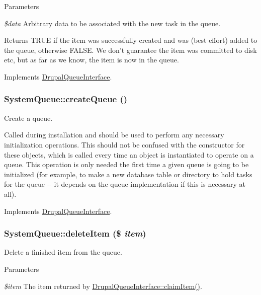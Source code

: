 \begin{DoxyParams}{Parameters}
\item[{\em \$data}]Arbitrary data to be associated with the new task in the queue. \end{DoxyParams}
\begin{DoxyReturn}{Returns}
TRUE if the item was successfully created and was (best effort) added to the queue, otherwise FALSE. We don't guarantee the item was committed to disk etc, but as far as we know, the item is now in the queue. 
\end{DoxyReturn}


Implements \hyperlink{interfaceDrupalQueueInterface_a1bdef6341808aaf8b3de821b7b71f137}{DrupalQueueInterface}.\hypertarget{classSystemQueue_a92bade740b59032aced46cfcbfaaeed6}{
\subsubsection[{createQueue}]{\setlength{\rightskip}{0pt plus 5cm}SystemQueue::createQueue ()}}
\label{classSystemQueue_a92bade740b59032aced46cfcbfaaeed6}
Create a queue.

Called during installation and should be used to perform any necessary initialization operations. This should not be confused with the constructor for these objects, which is called every time an object is instantiated to operate on a queue. This operation is only needed the first time a given queue is going to be initialized (for example, to make a new database table or directory to hold tasks for the queue -\/-\/ it depends on the queue implementation if this is necessary at all). 

Implements \hyperlink{interfaceDrupalQueueInterface_a5a657d8c1d5bb429b3e594fa0c883ad3}{DrupalQueueInterface}.\hypertarget{classSystemQueue_a868c037c23889db59acfeadc5d30c6f9}{
\subsubsection[{deleteItem}]{\setlength{\rightskip}{0pt plus 5cm}SystemQueue::deleteItem (\$ {\em item})}}
\label{classSystemQueue_a868c037c23889db59acfeadc5d30c6f9}
Delete a finished item from the queue.


\begin{DoxyParams}{Parameters}
\item[{\em \$item}]The item returned by \hyperlink{interfaceDrupalQueueInterface_a2f0f2ccc1f4d55c0890897ea85e75954}{DrupalQueueInterface::claimItem()}. \end{DoxyParams}


